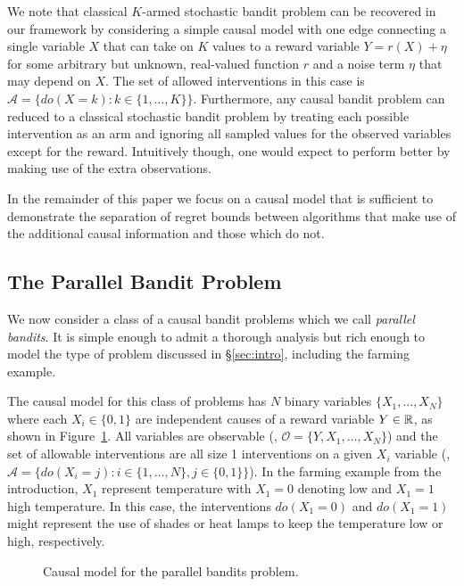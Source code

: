 We note that classical $K$-armed stochastic bandit problem can be recovered in our framework by considering a simple causal model with one edge connecting a single variable $X$ that can take on $K$ values to a reward variable $Y = r(X) + \eta$ for some arbitrary but unknown, real-valued function $r$ and a noise term $\eta$ that may depend on $X$.
The set of allowed interventions in this case is $\mathcal{A} = \{ do(X = k) \colon k \in \{1, \ldots, K\}\}$.
Furthermore, any causal bandit problem can reduced to a classical stochastic bandit problem by treating each possible intervention as an arm and ignoring all sampled values for the observed variables except for the reward.
Intuitively though, one would expect to perform better by making use of the extra observations.

In the remainder of this paper we focus on a causal model that is sufficient to demonstrate the separation of regret bounds between algorithms that make use of the additional causal information and those which do not.


\subsection{The Parallel Bandit Problem}

We now consider a class of a causal bandit problems which we call \emph{parallel bandits}.
It is simple enough to admit a thorough analysis but rich enough to model the type of problem discussed in \S\ref{sec:intro}, including the farming example.

The causal model for this class of problems has $N$ binary variables $\{ X_1, \ldots, X_N \}$ where each $X_i \in \{0,1\}$ are independent causes of a reward variable $Y \in \mathbb R$, as shown in Figure~\ref{fig:causalStructure}.
All variables are observable (\ie, $\mathcal{O} = \{Y, X_1, \ldots, X_N\}$) and the set of allowable interventions are all size 1 interventions on a given $X_i$ variable (\ie, $\mathcal{A} = \{ do(X_i = j) \colon i \in \{1, \ldots, N\}, j \in \{0,1\}\}$).
In the farming example from the introduction, $X_1$ represent temperature with $X_1=0$ denoting low and $X_1=1$ high temperature. In this case, the interventions $do(X_1 = 0)$ and $do(X_1 = 1)$ might represent the use of shades or heat lamps to keep the temperature low or high, respectively.


\begin{figure}[h]
\centering
{}
\caption{Causal model for the parallel bandits problem.\label{fig:causalStructure}}
\end{figure}

